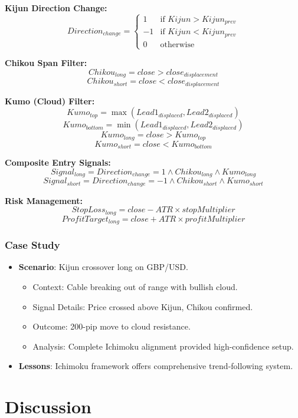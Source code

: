 \documentclass[12pt]{article}
\begin{document}
\textbf{Kijun Direction Change:}
\[
Direction_{change} = \begin{cases} 
1 & \text{if } Kijun > Kijun_{prev} \\
-1 & \text{if } Kijun < Kijun_{prev} \\
0 & \text{otherwise}
\end{cases}
\]

\textbf{Chikou Span Filter:}
\[
Chikou_{long} = close > close_{displacement}
\]
\[
Chikou_{short} = close < close_{displacement}
\]

\textbf{Kumo (Cloud) Filter:}
\[
Kumo_{top} = \max(Lead1_{displaced}, Lead2_{displaced})
\]
\[
Kumo_{bottom} = \min(Lead1_{displaced}, Lead2_{displaced})
\]
\[
Kumo_{long} = close > Kumo_{top}
\]
\[
Kumo_{short} = close < Kumo_{bottom}
\]

\textbf{Composite Entry Signals:}
\[
Signal_{long} = Direction_{change} = 1 \land Chikou_{long} \land Kumo_{long}
\]
\[
Signal_{short} = Direction_{change} = -1 \land Chikou_{short} \land Kumo_{short}
\]

\textbf{Risk Management:}
\[
StopLoss_{long} = close - ATR \times stopMultiplier
\]
\[
ProfitTarget_{long} = close + ATR \times profitMultiplier
\]

\subsubsection{Case Study}
\begin{itemize}
\item \textbf{Scenario}: Kijun crossover long on GBP/USD.
  \begin{itemize}
  \item Context: Cable breaking out of range with bullish cloud.
  \item Signal Details: Price crossed above Kijun, Chikou confirmed.
  \item Outcome: 200-pip move to cloud resistance.
  \item Analysis: Complete Ichimoku alignment provided high-confidence setup.
  \end{itemize}
\item \textbf{Lessons}: Ichimoku framework offers comprehensive trend-following system.
\end{itemize}

\section{Discussion}
\label{sec:discussion}
\end{document}
